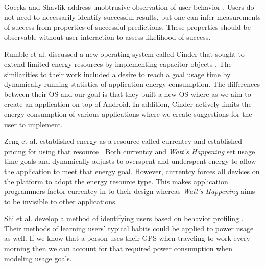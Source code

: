 Goecks and Shavlik address unobtrusive observation of user behavior \cite{Goecks:2000:LUI:325737.325806}. 
Users do not need to necessarily identify successful results, but one can infer measurements of success from properties of successful predictions. 
These properties should be observable without user interaction to assess likelihood of success. 


Rumble et al. discussed a new operating system called Cinder that sought to extend limited energy resources by implementing capacitor objects \cite{Rumble:2009:AJT:1592606.1592618}. 
The similarities to their work included a desire to reach a goal usage time by dynamically running statistics of application energy consumption. 
The differences between their OS and our goal is that they built a new OS where as we aim to create an application on top of Android. 
In addition, Cinder actively limits the energy consumption of various applications where we create suggestions for the user to implement. 

Zeng et al. established energy as a resource called currentcy and established pricing for using that resource \cite{Zeng:2003:CUA:1247340.1247344}. 
Both currentcy and\emph{ Watt's Happening} set usage time goals and dynamically adjusts to overspent and underspent energy to allow the application to meet that energy goal. 
However, currentcy forces all devices on the platform to adopt the energy resource type. 
This makes application programmers factor currentcy in to their design whereas \emph{Watt's Happening} aims to be invisible to other applications. 

Shi et al. develop a method of identifying users based on behavior profiling \cite{learningUserBehavior}. 
Their methods of learning users' typical habits could be applied to power usage as well. 
If we know that a person uses their GPS when traveling to work every morning then we can account for that required power consumption when modeling usage goals. 

